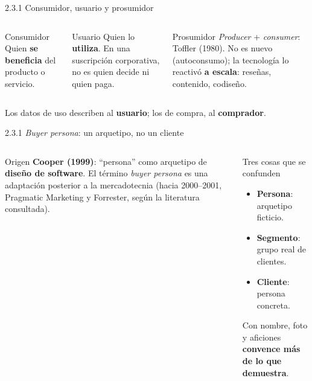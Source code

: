 \documentclass[aspectratio=169,xcolor=dvipsnames]{beamer}
\begin{document}
\begin{frame}{2.3.1 Consumidor, usuario y prosumidor}
\begin{columns}[T]
  \begin{block}{Consumidor}
    \small Quien \textbf{se beneficia} del producto o servicio.
  \end{block}
  \begin{block}{Usuario}
    \small Quien lo \textbf{utiliza}. En una suscripción corporativa, no es quien decide ni quien paga.
  \end{block}
  \begin{exampleblock}{Prosumidor}
    \small \textit{Producer} + \textit{consumer}: Toffler (1980). No es nuevo (autoconsumo); la tecnología lo reactivó \textbf{a escala}: reseñas, contenido, codiseño.
  \end{exampleblock}
\end{columns}
\vspace{6pt}
{\small\color{IPNgris} Los datos de uso describen al \textbf{usuario}; los de compra, al \textbf{comprador}.}
\end{frame}

\begin{frame}{2.3.1 \textit{Buyer persona}: un arquetipo, no un cliente}
\begin{columns}[T]
  \begin{block}{Origen}
    \small \textbf{Cooper (1999)}: \enquote{persona} como arquetipo de \textbf{diseño de software}. El término \textit{buyer persona} es una adaptación posterior a la mercadotecnia (hacia 2000--2001, Pragmatic Marketing y Forrester, según la literatura consultada).
  \end{block}
  \begin{alertblock}{Tres cosas que se confunden}
    \small
    \begin{itemize}
      \item \textbf{Persona}: arquetipo ficticio.
      \item \textbf{Segmento}: grupo real de clientes.
      \item \textbf{Cliente}: persona concreta.
    \end{itemize}
    Con nombre, foto y aficiones \textbf{convence más de lo que demuestra}.
  \end{alertblock}
\end{columns}
\end{frame}
\end{document}
